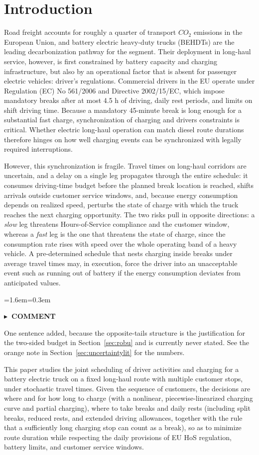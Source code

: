 \documentclass[preprint,12pt,3p]{elsarticle}
\newcommand{\NEW}[1]{{\color{annpurple}#1}}
\newenvironment{ann}[2]{%
  \par\addvspace{4pt}%
  \begin{list}{}{\leftmargin=1.6em\rightmargin=0.3em\topsep=0pt\parsep=3pt\itemsep=0pt\listparindent=0pt}%
  \item[]\color{#1}\small\textbf{\textsf{#2}}\par\nopagebreak\vspace{1pt}\color{#1}\small\ignorespaces}
  {\end{list}\addvspace{4pt}}
\newenvironment{acmt}{\begin{ann}{anngreen}{$\blacktriangleright$\ COMMENT}}{\end{ann}}
\begin{document}
\section{Introduction} \label{intro}
Road freight accounts for roughly a quarter of transport $CO_2$ emissions in the European Union, and battery electric heavy-duty trucks (BEHDTs) are the leading decarbonization pathway for the segment. Their deployment in long-haul  service, however, is first constrained by battery capacity and charging infrastructure, but also by an operational factor that is absent for passenger electric vehicles: driver's regulations. Commercial drivers in the EU operate under Regulation (EC) No 561/2006 and Directive 2002/15/EC, which impose mandatory breaks after at most 4.5 h of driving, daily rest periods, and limits on shift driving time.
Because a mandatory 45-minute break is long enough for a substantial fast charge, synchronization of charging and drivers constraints is critical. Whether electric long-haul operation can match diesel route durations therefore hinges on how well charging events can be synchronized with legally required interruptions.

However, this synchronization is fragile. Travel times on long-haul corridors are uncertain, and a delay on a single leg propagates through the entire schedule: it consumes driving-time budget before the planned break location is reached, shifts arrivals outside customer service windows, and, because energy consumption depends on realized speed, perturbs the state of charge with which the truck reaches the next charging opportunity. \NEW{The two risks pull in opposite directions: a \emph{slow} leg threatens Hours-of-Service compliance and the customer window, whereas a \emph{fast} leg is the one that threatens the state of charge, since the consumption rate rises with speed over the whole operating band of a heavy vehicle.} A pre-determined schedule that nests charging inside breaks under average travel times may, in execution, force the driver into an unacceptable event such as running out of battery if the energy consumption deviates from anticipated values.

\begin{acmt}
One sentence added, because the opposite-tails structure is the justification for
the two-sided budget in Section~\ref{sec:robu} and is currently never stated.
See the orange note in Section~\ref{sec:uncertaintylit} for the numbers.
\end{acmt}

This paper studies the joint scheduling of driver activities and charging for a battery electric truck on a fixed long-haul route with multiple customer stops, under stochastic travel times. Given the sequence of customers, the decisions are where and for how long to charge (with a nonlinear, piecewise-linearized charging curve and partial charging), where to take breaks and daily rests (including split breaks, reduced rests, and extended driving allowances, together with the rule that a sufficiently long charging stop can count as a break), so as to minimize route duration while respecting the daily provisions of EU HoS regulation, battery limits, and customer service windows.
\end{document}
